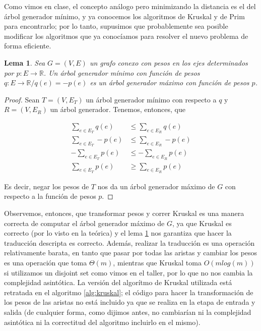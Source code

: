 \documentclass{article}
\newtheorem{lemma}{Lema}[theorem]
\theoremstyle{definition}
\theoremstyle{remark}
\begin{document}
Como vimos en clase, el concepto análogo pero minimizando la distancia es el del árbol generador mínimo, y ya conocemos los algoritmos de Kruskal y de Prim para encontrarlo; por lo tanto, supusimos que probablemente sea posible modificar los algoritmos que ya conocíamos para resolver el nuevo problema de forma eficiente.

\begin{lemma}
Sea $G = (V, E)$ un grafo conexo con pesos en los ejes determinados por $p : E \to \mathbb{R}$. Un árbol generador mínimo con función de pesos $q : E \to \mathbb{R} / q(e) = -p(e)$ es un árbol generador máximo con función de pesos $p$.
\label{pr:agm}
\end{lemma}

\begin{proof}
Sean $T = (V, E_T)$ un árbol generador mínimo con respecto a $q$ y $R = (V, E_R)$ un árbol generador. Tenemos, entonces, que

\begin{align*}
\sum_{e \in E_T} q(e) &\leq \sum_{e \in E_R} q(e)\\
\sum_{e \in E_T} -p(e) &\leq \sum_{e \in E_R} -p(e)\\
-\sum_{e \in E_T} p(e) &\leq -\sum_{e \in E_R} p(e)\\
\sum_{e \in E_T} p(e) &\geq \sum_{e \in E_R} p(e)
\end{align*}

Es decir, negar los pesos de $T$ nos da un árbol generador máximo de $G$ con respecto a la función de pesos $p$.
\end{proof}

Observemos, entonces, que transformar pesos y correr Kruskal es una manera correcta de computar el árbol generador máximo de $G$, ya que Kruskal es correcto (por lo visto en la teórica) y el lema \ref{pr:agm} nos garantiza que hacer la traducción descripta es correcto. Además, realizar la traducción es una operación relativamente barata, en tanto que pasar por todas las aristas y cambiar los pesos es una operación que toma $\Theta(m)$, mientras que Kruskal toma $O(m log(m))$ si utilizamos un disjoint set como vimos en el taller, por lo que no nos cambia la complejidad asintótica. La versión del algorítmo de Kruskal utilizada está retratada en el algoritmo \ref{alg:kruskal}; el código para hacer la transformación de los pesos de las aristas no está incluido ya que se realiza en la etapa de entrada y salida (de cualquier forma, como dijimos antes, no cambiarían ni la complejidad asintótica ni la correctitud del algoritmo incluirlo en el mismo).
\end{document}
